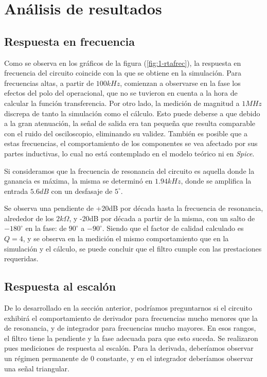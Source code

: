 \documentclass[../../tc_tp3_main.tex]{subfiles}
\begin{document}
\section{An\'alisis de resultados}

\subsection{Respuesta en frecuencia}



Como se observa en los gr\'aficos de la figura (\ref{fig:1-rtafrec}), la respuesta en frecuencia del circuito coincide con la que se obtiene en la simulaci\'on. Para frecuencias altas, a partir de $100kHz$, comienzan a observarse en la fase los efectos del polo del operacional, que no se tuvieron en cuenta a la hora de calcular la funci\'on transferencia. Por otro lado, la medici\'on de magnitud a $1MHz$ discrepa de tanto la simulaci\'on como el c\'alculo. Esto puede deberse a que debido a la gran atenuaci\'on, la se\~nal de salida era tan peque\~na que resulta comparable con el ruido del osciloscopio, eliminando su validez. Tambi\'en es posible que a estas frecuencias, el comportamiento de los componentes se vea afectado por sus partes inductivas, lo cual no est\'a contemplado en el modelo te\'orico ni en \textit{Spice}. \par

Si consideramos que la frecuencia de resonancia del circuito es aquella donde la ganancia es m\'axima, la misma se determin\'o en $1.94kHz$, donde se amplifica la entrada $5.6dB$ con un desfasaje de $5^\circ$.\par

Se observa una pendiente de +20dB por d\'ecada hasta la frecuencia de resonancia, alrededor de los $2k\Omega$, y -20dB por d\'ecada a partir de la misma, con un salto de $-180^\circ$ en la fase: de $90^\circ$ a $-90^\circ$. Siendo que el factor de calidad calculado es $Q=4$, y se observa en la medici\'on el mismo comportamiento que en la simulaci\'on y el c\'alculo, se puede concluir que el filtro cumple con las prestaciones requeridas. 

\subsection{Respuesta al escal\'on}

De lo desarrollado en la secci\'on anterior, podr\'iamos preguntarnos si el circuito exhibir\'a el comportamiento de derivador para frecuencias mucho menores que la de resonancia, y de integrador para frecuencias mucho mayores. En esos rangos, el filtro tiene la pendiente y la fase adecuada para que esto suceda. Se realizaron pues mediciones de respuesta al escal\'on. Para la derivada, deber\'iamos observar un r\'egimen permanente de 0 constante, y en el integrador deber\'iamos observar una se\~nal triangular.
\end{document}
